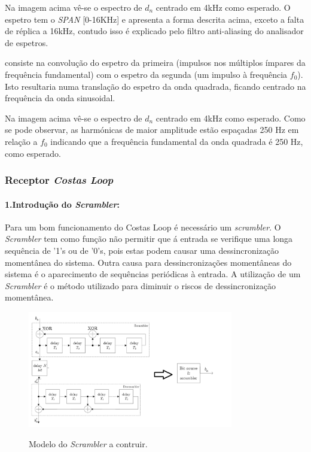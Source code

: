 \documentclass[11pt]{article}
\numberwithin{equation}{section}
\begin{document}
Na imagem acima vê-se o espectro de $d_n$ centrado em 4kHz como esperado. O espetro tem o \textit{SPAN} [0-16KHz] e apresenta a forma descrita acima, exceto a falta de réplica a 16kHz, contudo isso é explicado pelo filtro anti-aliasing do analisador de espetros.

consiste na convolução do espetro da primeira (impulsos nos múltiplos ímpares da frequência fundamental) com o espetro da segunda (um impulso à frequência $f_0$). Isto resultaria numa translação do espetro da onda quadrada, ficando centrado na frequência da onda sinusoidal.

Na imagem acima vê-se o espectro de $d_n$ centrado em 4kHz como esperado. Como se pode observar, as harmónicas de maior amplitude estão espaçadas 250 Hz em relação a $f_0$ indicando que a frequência fundamental da onda quadrada é 250 Hz, como esperado.

\subsubsection{Receptor \textit{Costas Loop}}

\paragraph{1.Introdução do \textit{Scrambler}:} \hspace{0pt}


Para um bom funcionamento do Costas Loop é necessário um \textit{scrambler}. O \textit{Scrambler} tem como função não permitir que á entrada se verifique uma longa sequência de '1's ou de '0's, pois estas podem causar uma dessincronização momentânea do sistema. Outra causa para dessincronizações momentâneas do sistema é o aparecimento de sequências periódicas à entrada. A utilização de um \textit{Scrambler} é o  método utilizado para diminuir o riscos de dessincronização momentânea.

\begin{figure}[H]
	\centering
	\includegraphics[width=0.8\textwidth]{./Scrambler}~\\
	\caption{Modelo do \textit{Scrambler} a contruir.}
	\label{fig:scrambler}
\end{figure}
\end{document}
